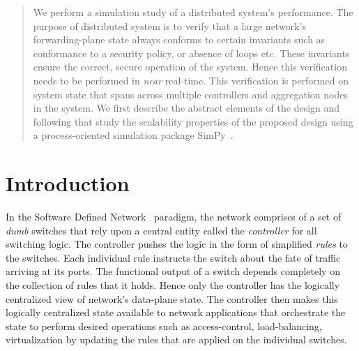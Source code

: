 \documentclass[conference]{IEEEtran}
\begin{document}
\begin{abstract}

We perform a simulation study of a distributed system's performance. The purpose of distributed system is to verify that a large network's forwarding-plane state always conforms to certain invariants such as conformance to a security policy, or absence of loops etc. These invariants ensure the correct, secure operation of the system. Hence this verification needs to be performed in \textit{near} real-time. This verification is performed on system state that spans across multiple controllers and aggregation nodes in the system. We first describe the abstract elements of the design and following that study the scalability properties of the proposed design using a process-oriented simulation package SimPy~\cite{simpy}.

\end{abstract}





%
\IEEEpeerreviewmaketitle


\section{Introduction}

In the Software Defined Network~\cite{openflow} paradigm, the network comprises of a set of \textit{dumb} switches that rely upon a central entity called the \textit{controller} for all switching logic. The controller pushes the logic in the form of simplified \textit{rules} to the switches. Each individual rule instructs the switch  about the fate of traffic arriving at its ports. The functional output of a switch depends completely on the collection of rules that it holds. Hence only the controller has the logically centralized view of network's data-plane state. The controller then makes this logically centralized state available to network applications that orchestrate the state to perform desired operations such as access-control, load-balancing, virtualization by updating the rules that are applied on the individual switches.
\end{document}
